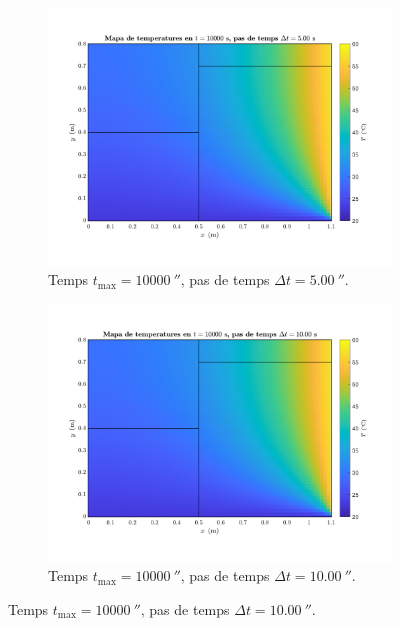 \begin{figure}[ht]
\begin{subfigure}{.5\textwidth}
		\label{fig:pas_temps_14}
	\end{subfigure}
	\begin{subfigure}{.5\textwidth}
		\centering
		\includegraphics[width=.95\linewidth]{imagenes/04_analisi_influencia_dades_numeriques/pas_temps/pas_temps_15.pdf}
		\vspace{-15pt}
		\caption{Temps $t_\text{max} = 10000 \ \second$, pas de temps $\Delta t = 5.00 \ \second$.}
		\label{fig:pas_temps_15}
	\end{subfigure}%
	\begin{subfigure}{.5\textwidth}
		\centering
		\includegraphics[width=.95\linewidth]{imagenes/04_analisi_influencia_dades_numeriques/pas_temps/pas_temps_16.pdf}
		\vspace{-15pt}
		\caption{Temps $t_\text{max} = 10000 \ \second$, pas de temps $\Delta t = 10.00 \ \second$.}

\end{subfigure}
\end{figure}
